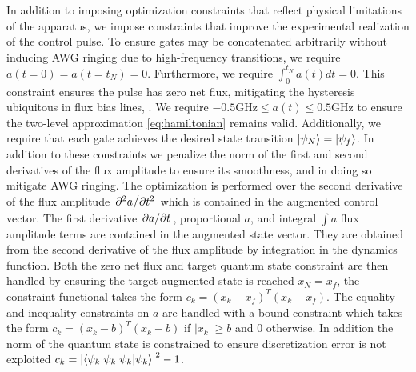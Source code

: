 In addition to imposing optimization constraints that
reflect physical limitations of the apparatus, we impose
constraints that improve the experimental realization of the control pulse.
To ensure gates may be concatenated arbitrarily without
inducing AWG ringing due to high-frequency transitions,
we require $a(t = 0) = a(t = t_{N}) = 0$.
Furthermore, we require $\int_{0}^{t_{N}} a(t) dt = 0$. This
constraint ensures the pulse has zero net flux, mitigating
the hysteresis ubiquitous in flux bias lines,
\cite{battistel2019fast, krantz2019quantum, zhang2020universal}.
We require $-0.5 \textrm{GHz} \le a(t) \le 0.5 \textrm{GHz}$
to ensure the two-level approximation \eqref{eq:hamiltonian}
remains valid. Additionally, we require that each gate achieves
the desired state transition $\ket{\psi_{N}} = \ket{\psi_{f}}$.
In addition to these constraints we penalize the norm
of the first and second derivatives of the flux amplitude to
ensure its smoothness, and in doing so mitigate AWG ringing.
The optimization is performed over the second derivative of the flux amplitude
$\pdv*[2]{a}{t}$ which is contained in the
augmented control vector. The first derivative
$\pdv*{a}{t}$, proportional $a$, and integral $\int a$
flux amplitude terms
are contained in the augmented state vector. They are obtained from
the second derivative of the flux amplitude by
integration in the dynamics function.
Both the zero net flux and target quantum state constraint
are then handled by ensuring the target augmented state is
reached $x_{N} = x_{f}$, the constraint functional 
 takes the form
$c_{k} = (x_{k} - x_{f})^{T}(x_{k} - x_{f})$.
The equality and inequality constraints on $a$ are handled
with a bound constraint which takes the form
$c_{k} = (x_{k} - b)^{T}(x_{k} - b)$ if $\lvert x_{k} \rvert \ge b$
and $0$ otherwise.
In addition the norm of the quantum state
is constrained to ensure discretization error is not
exploited $c_{k} = {\lvert \braket{\psi_{k} \lvert \psi_{k}} \rvert}^{2} - 1$.

